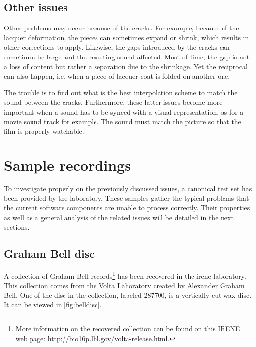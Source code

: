 \subsection{Other issues}

Other problems may occur because of the cracks. For example, because of the lacquer deformation, the pieces can sometimes expand or shrink, which results in other corrections to apply. Likewise, the gaps introduced by the cracks can sometimes be large and the resulting sound affected. Most of time, the gap is not a loss of content but rather a separation due to the shrinkage. Yet the reciprocal can also happen, i.e. when a piece of lacquer coat is folded on another one.

The trouble is to find out what is the best interpolation scheme to match the sound between the cracks. Furthermore, these latter issues become more important when a sound has to be synced with a visual representation, as for a movie sound track for example. The sound must match the picture so that the film is properly watchable.

\section{Sample recordings}
\label{sec:samplerec}

To investigate properly on the previously discussed issues, a canonical test set has been provided by the laboratory. These samples gather the typical problems that the current software components are unable to process correctly. Their properties as well as a general analysis of the related issues will be detailed in the next sections.

\subsection{Graham Bell disc}

A collection of Graham Bell records\footnote{More information on the recovered collection can be found on this IRENE web page: \url{http://bio16p.lbl.gov/volta-release.html}.} has been recovered in the \gls{irene} laboratory. This collection comes from the Volta Laboratory created by Alexander Graham Bell. One of the disc in the collection, labeled 287700, is a vertically-cut wax disc. It can be viewed in \autoref{fig:belldisc}.

